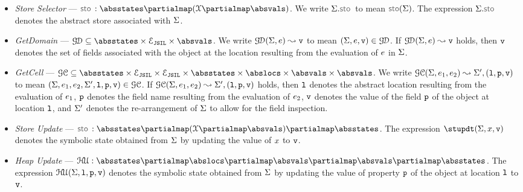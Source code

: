 \begin{itemize}
  \item \emph{Store Selector} --- $\stosel : \absstates \partialmap (\jvars \partialmap \absvals)$. 
           We write $\absstate.\stosel$ to mean $\stosel\!(\absstate)$. 
           The expression $\absstate.\stosel$ denotes the abstract store associated with $\Sigma$. 
             
  \item \emph{GetDomain} --- $\getdomain \subseteq \absstates \times \exprs \times \absvals$. 
           We write $\mathcal{G\!D}(\Sigma, e) \leadsto \mathtt{v}$ to mean $(\Sigma, e, \mathtt{v}) \in \mathcal{G\!D}$. 
           If $\mathcal{G\!D}(\Sigma, e) \leadsto \mathtt{v}$ holds, then $\mathtt{v}$ denotes the 
           set of fields associated with the object at the location resulting from the evaluation of $e$ 
           in $\Sigma$. 
  
  \item \emph{GetCell} ---  $\getcell \subseteq \absstates \times \exprs \times \exprs \times \absstates \times \abslocs \times \absvals \times \absvals$. 
          We write $\mathcal{GC}(\Sigma, e_1, e_2) \leadsto \Sigma', (\mathtt{l}, \mathtt{p}, \mathtt{v})$ to mean 
           $(\Sigma, e_1, e_2, \Sigma', \mathtt{l}, \mathtt{p}, \mathtt{v}) \in \mathcal{GC}$. 
          If $\mathcal{GC}(\Sigma, e_1, e_2) \leadsto \Sigma', (\mathtt{l}, \mathtt{p}, \mathtt{v})$ holds, 
          then  $\mathtt{l}$ denotes the abstract location resulting from the evaluation of $e_1$, 
           $\mathtt{p}$ denotes the field name resulting from the evaluation of $e_2$, 
           $\mathtt{v}$ denotes the value of the field $\mathtt{p}$ of the object at location $\mathtt{l}$, 
          and  $\Sigma'$ denotes the re-arrangement of $\Sigma$ to allow for the field inspection. 
          
   \item \emph{Store Update} --- $\stosel : \absstates \partialmap (\jvars \partialmap \absvals) \partialmap \absstates$. 
             The expression $\stupdt(\absstate, \jvar, \absval)$ denotes the symbolic state obtained from $\Sigma$ 
             by  updating the value of $x$ to $\mathtt{v}$. 
             
   \item \emph{Heap Update} --- $\hpupdt : \absstates \partialmap \abslocs \partialmap \absvals \partialmap \absvals \partialmap \absstates$. 
             The expression $\mathcal{H\!U}(\Sigma, \mathtt{l}, \mathtt{p}, \mathtt{v})$ denotes the symbolic state obtained from $\Sigma$ 
             by  updating the value of property $\mathtt{p}$ of the object at location $\mathtt{l}$ to $\mathtt{v}$. 
   

\end{itemize}
